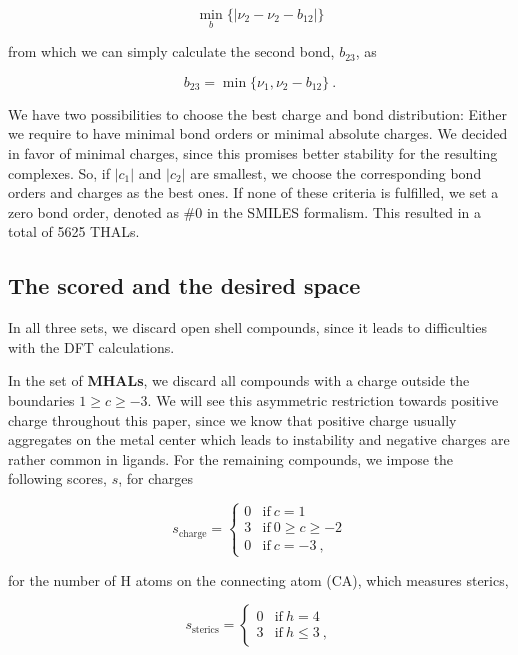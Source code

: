 \begin{equation}
\min_b\{|\nu_2 - \nu_2 - b_{12}|\}
\end{equation}

from which we can simply calculate the second bond, $b_{23}$, as

\begin{equation}
b_{23} = \min\{\nu_1, \nu_2 - b_{12}\} ~.
\end{equation}

We have two possibilities to choose the best charge and bond distribution: Either we require to have minimal bond orders or minimal absolute charges. We decided in favor of minimal charges, since this promises better stability for the resulting complexes. So, if $|c_1|$ and $|c_2|$ are smallest, we choose the corresponding bond orders and charges as the best ones. If none of these criteria is fulfilled, we set a zero bond order, denoted as $\#0$ in the SMILES formalism. This resulted in a total of 5625 THALs.

\subsection{The scored and the desired space}
In all three sets, we discard open shell compounds, since it leads to difficulties with the DFT calculations.

In the set of \textbf{MHALs}, we discard all compounds with a charge outside the boundaries $1 \geq c \geq -3$. We will see this asymmetric restriction towards positive charge throughout this paper, since we know that positive charge usually aggregates on the metal center which leads to instability and negative charges are rather common in ligands. For the remaining compounds, we impose the following scores, $s$, for charges

\begin{equation}
	s_{\textrm{charge}} = 
	\begin{cases}
	0	&	\mathrm{if}~ c = 1 \\
	3	&	\mathrm{if}~ 0 \geq c \geq -2 \\
	0   &	\mathrm{if}~ c = -3 ~,
	\end{cases}
\end{equation}

for the number of H atoms on the connecting atom (CA), which measures sterics,

\begin{equation}
	s_{\textrm{sterics}} = 
	\begin{cases}
	0	&	\mathrm{if}~ h = 4 \\
	3	&	\mathrm{if}~ h \leq 3 ~,
	\end{cases}
\end{equation}

